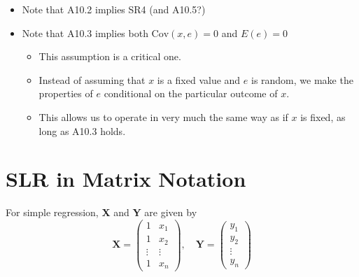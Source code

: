 \documentclass[14pt]{extarticle}
\begin{document}
\begin{itemize}
    \item Note that A10.2 implies SR4 (and A10.5?)
    \item Note that A10.3 implies both $\text{Cov}(x, e) = 0$ and $E(e) = 0$
    \begin{itemize}
        \item This assumption is a critical one.
        \item Instead of assuming that $x$ is a fixed value and $e$ is random, we make the properties of $e$ conditional on the particular outcome of $x$.
        \item This allows us to operate in very much the same way as if $x$ is fixed, as long as A10.3 holds.
    \end{itemize}
\end{itemize}

\newpage 
\section*{SLR in Matrix Notation}

For simple regression, \textbf{X} and \textbf{Y} are given by
\[
\textbf{X} = \begin{pmatrix}
1 & x_1 \\
1 & x_2 \\
\vdots & \vdots \\
1 & x_n
\end{pmatrix}, \quad
\textbf{Y} = \begin{pmatrix}
y_1 \\
y_2 \\
\vdots \\
y_n
\end{pmatrix}
\]
\end{document}
